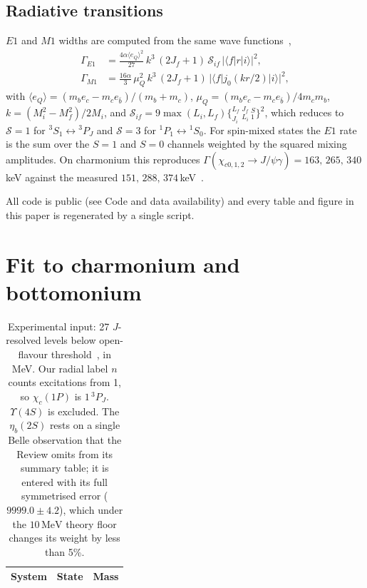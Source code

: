 \documentclass[10pt,twocolumn]{article}
\newcommand{\MeV}{\,\mathrm{MeV}}
\begin{document}
\subsection{Radiative transitions}

$E1$ and $M1$ widths are computed from the same wave functions~\cite{Eichten1994},
\begin{align}
  \Gamma_{E1} &= \frac{4\alpha\langle e_Q\rangle^2}{27}\,k^3\,(2J_f+1)\,\mathcal S_{if}\,|\langle f|r|i\rangle|^2,\\
  \Gamma_{M1} &= \frac{16\alpha}{3}\,\mu_Q^2\,k^3\,(2J_f+1)\,|\langle f|j_0(kr/2)|i\rangle|^2,
\end{align}
with $\langle e_Q\rangle=(m_be_c-m_ce_{\bar b})/(m_b+m_c)$, $\mu_Q=(m_be_c-m_ce_{\bar b})/4m_cm_b$, $k=(M_i^2-M_f^2)/2M_i$, and $\mathcal S_{if}=9\max(L_i,L_f)\{^{L_f}_{J_i}\,^{J_f}_{L_i}\,^{S}_{1}\}^2$, which reduces to $\mathcal S=1$ for $^3S_1\leftrightarrow{}^3P_J$ and $\mathcal S=3$ for $^1P_1\leftrightarrow{}^1S_0$.
For spin-mixed states the $E1$ rate is the sum over the $S=1$ and $S=0$ channels weighted by the squared mixing amplitudes.
On charmonium this reproduces $\Gamma(\chi_{c0,1,2}\to J/\psi\gamma)=163,\,265,\,340\,$keV against the measured $151,\,288,\,374\,$keV~\cite{PDG2026}.

All code is public (see Code and data availability) and every table and figure in this paper is regenerated by a single script.

\section{Fit to charmonium and bottomonium}
\label{sec:fit}

\begin{table}[t]
\caption{Experimental input: 27 $J$-resolved levels below open-flavour threshold~\cite{PDG2026}, in MeV. Our radial label $n$ counts excitations from 1, so $\chi_c(1P)$ is $1\,^3P_J$. $\Upsilon(4S)$ is excluded. The $\eta_b(2S)$ rests on a single Belle observation that the Review omits from its summary table; it is entered with its full symmetrised error ($9999.0\pm4.2$), which under the $10\MeV$ theory floor changes its weight by less than 5\%.}
\label{tab:data}
\centering\small
\begin{tabular}{llr}
\toprule
System & State & Mass \\
\midrule

\end{tabular}
\end{table}
\end{document}
